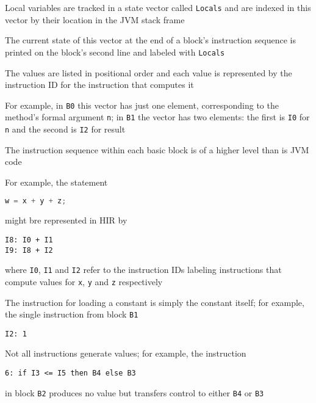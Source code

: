 \documentclass[8pt,a4paper,compress]{beamer}
\begin{document}
\begin{frame}[fragile]
\pause

Local variables are tracked in a state vector called \lstinline{Locals} and are indexed in this vector
by their location in the JVM stack frame

\pause
\bigskip

The current state of this vector at the end of a block's instruction sequence is printed on the block's second line and labeled with \lstinline{Locals}

\pause
\bigskip

The values are listed in positional order and each value is represented by the instruction ID for the instruction that computes it

\pause
\bigskip

For example, in \lstinline{B0} this vector has just one element, corresponding to the method's formal argument \lstinline{n}; in \lstinline{B1} the vector has two elements: the first is \lstinline{I0} for \lstinline{n} and the second is \lstinline{I2} for result

\pause
\bigskip

The instruction sequence within each basic block is of a higher level than is JVM code

\pause
\bigskip

For example, the \jmm statement 
\begin{lstlisting}[language=Java,style=focusin]
w = x + y + z;
\end{lstlisting}
\noindent might bre represented in HIR by
\begin{lstlisting}[language={},style=focusin]
I8: I0 + I1
I9: I8 + I2
\end{lstlisting}
where \lstinline{I0}, \lstinline{I1} and \lstinline{I2} refer to the instruction IDs labeling instructions that compute values for \lstinline{x}, \lstinline{y} and \lstinline{z} respectively
\end{frame}

\begin{frame}[fragile]
\pause

The instruction for loading a constant is simply the constant itself; for example, the single instruction from block \lstinline{B1} 
\begin{lstlisting}[language={},style=focusin]
I2: 1
\end{lstlisting}

\pause
\bigskip

Not all instructions generate values; for example, the instruction
\begin{lstlisting}[language={}]
6: if I3 <= I5 then B4 else B3
\end{lstlisting}
\noindent in block \lstinline{B2} produces no value but transfers control to either \lstinline{B4} or \lstinline{B3}
\end{frame}
\end{document}

